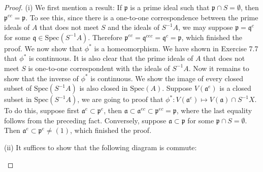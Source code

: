 \begin{proof}
(i) We first mention a result: If $\mathfrak{p}$ is a prime ideal such that $\mathfrak{p}\cap S=\emptyset$, then $\mathfrak{p}^{ec}=\mathfrak{p}$. To see this, since there is a one-to-one correspondence between the prime ideals of $A$ that does not meet $S$ and the ideals of $S^{-1}A$, we may suppose $\mathfrak{p}=\mathfrak{q}^c$ for some $\mathfrak{q}\in\mathrm{Spec}(S^{-1}A)$. Therefore $\mathfrak{p}^{ec}=\mathfrak{q}^{cec}=\mathfrak{q}^c=\mathfrak{p}$, which finished the proof. We now show that $\phi^*$ is a homeomorphism. We have shown in Exercise 7.7 that $\phi^*$ is continuous. It is also clear that the prime ideals of $A$ that does not meet $S$ is one-to-one correspondent with the ideals of $S^{-1}A$. Now it remains to show that the inverse of $\phi^*$ is continuous. We show the image of every closed subset of $\mathrm{Spec}(S^{-1}A)$ is also closed in $\mathrm{Spec}(A)$. Suppose $V(\mathfrak{a}^e)$ is a closed subset in $\mathrm{Spec}(S^{-1}A)$, we are going to proof that $\phi^*:V(\mathfrak{a}^e)\mapsto V(\mathfrak{a})\cap S^{-1}X$. To do this, suppose first $\mathfrak{a}^e\subset\mathfrak{p}^e$, then $\mathfrak{a}\subset\mathfrak{a}^{ec}\subset\mathfrak{p}^{ec}=\mathfrak{p}$, where the last equality follows from the preceding fact. Conversely, suppose $\mathfrak{a}\subset\mathfrak{p}$ for some $\mathfrak{p}\cap S=\emptyset$. Then $\mathfrak{a}^e\subset\mathfrak{p}^e\ne (1)$, which finished the proof.\par
(ii) It suffices to show that the following diagram is commute: 
\begin{center}



\end{center}
\end{proof}
